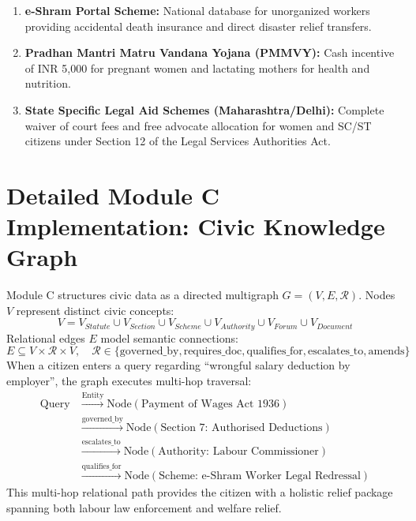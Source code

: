 \begin{enumerate}
    \item \textbf{e-Shram Portal Scheme:} National database for unorganized workers providing accidental death insurance and direct disaster relief transfers.
    \item \textbf{Pradhan Mantri Matru Vandana Yojana (PMMVY):} Cash incentive of INR 5,000 for pregnant women and lactating mothers for health and nutrition.
    \item \textbf{State Specific Legal Aid Schemes (Maharashtra/Delhi):} Complete waiver of court fees and free advocate allocation for women and SC/ST citizens under Section 12 of the Legal Services Authorities Act.
\end{enumerate}

\section{Detailed Module C Implementation: Civic Knowledge Graph}
\label{sec:module_c_impl}
Module C structures civic data as a directed multigraph $G = (V, E, \mathcal{R})$. Nodes $V$ represent distinct civic concepts:
\begin{equation}
V = V_{Statute} \cup V_{Section} \cup V_{Scheme} \cup V_{Authority} \cup V_{Forum} \cup V_{Document}
\end{equation}
Relational edges $E$ model semantic connections:
\begin{equation}
E \subseteq V \times \mathcal{R} \times V, \quad \mathcal{R} \in \{\text{governed\_by}, \text{requires\_doc}, \text{qualifies\_for}, \text{escalates\_to}, \text{amends}\}
\end{equation}
When a citizen enters a query regarding ``wrongful salary deduction by employer'', the graph executes multi-hop traversal:
\begin{align*}
\text{Query} &\xrightarrow{\text{Entity}} \text{Node}(\text{Payment of Wages Act 1936}) \\
&\xrightarrow{\text{governed\_by}} \text{Node}(\text{Section 7: Authorised Deductions}) \\
&\xrightarrow{\text{escalates\_to}} \text{Node}(\text{Authority: Labour Commissioner}) \\
&\xrightarrow{\text{qualifies\_for}} \text{Node}(\text{Scheme: e-Shram Worker Legal Redressal})
\end{align*}
This multi-hop relational path provides the citizen with a holistic relief package spanning both labour law enforcement and welfare relief.

